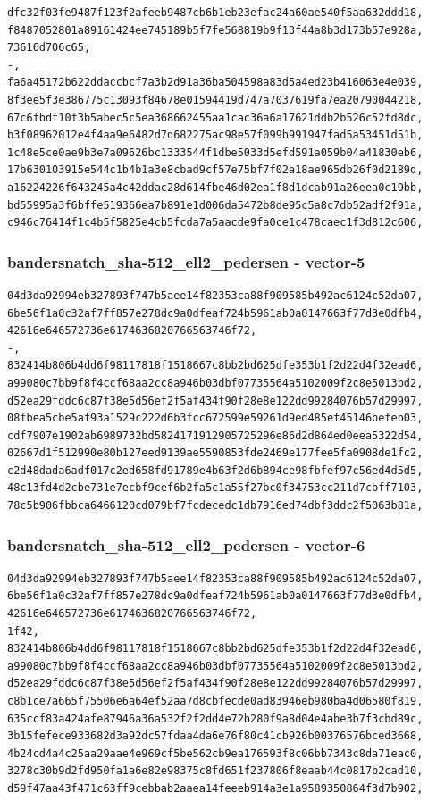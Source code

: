 \documentclass[
]{article}
\begin{document}
\begin{verbatim}
dfc32f03fe9487f123f2afeeb9487cb6b1eb23efac24a60ae540f5aa632ddd18,
f8487052801a89161424ee745189b5f7fe568819b9f13f44a8b3d173b57e928a,
73616d706c65,
-,
fa6a45172b622ddaccbcf7a3b2d91a36ba504598a83d5a4ed23b416063e4e039,
8f3ee5f3e386775c13093f84678e01594419d747a7037619fa7ea20790044218,
67c6fbdf10f3b5abec5c5ea368662455aa1cac36a6a17621ddb2b526c52fd8dc,
b3f08962012e4f4aa9e6482d7d682275ac98e57f099b991947fad5a53451d51b,
1c48e5ce0ae9b3e7a09626bc1333544f1dbe5033d5efd591a059b04a41830eb6,
17b630103915e544c1b4b1a3e8cbad9cf57e75bf7f02a18ae965db26f0d2189d,
a16224226f643245a4c42ddac28d614fbe46d02ea1f8d1dcab91a26eea0c19bb,
bd55995a3f6bffe519366ea7b891e1d006da5472b8de95c5a8c7db52adf2f91a,
c946c76414f1c4b5f5825e4cb5fcda7a5aacde9fa0ce1c478caec1f3d812c606,
\end{verbatim}

\subsubsection{bandersnatch\_sha-512\_ell2\_pedersen -
vector-5}\label{bandersnatch_sha-512_ell2_pedersen---vector-5}

\begin{verbatim}
04d3da92994eb327893f747b5aee14f82353ca88f909585b492ac6124c52da07,
6be56f1a0c32af7ff857e278dc9a0dfeaf724b5961ab0a0147663f77d3e0dfb4,
42616e646572736e6174636820766563746f72,
-,
832414b806b4dd6f98117818f1518667c8bb2bd625dfe353b1f2d22d4f32ead6,
a99080c7bb9f8f4ccf68aa2cc8a946b03dbf07735564a5102009f2c8e5013bd2,
d52ea29fddc6c87f38e5d56ef2f5af434f90f28e8e122dd99284076b57d29997,
08fbea5cbe5af93a1529c222d6b3fcc672599e59261d9ed485ef45146befeb03,
cdf7907e1902ab6989732bd5824171912905725296e86d2d864ed0eea5322d54,
02667d1f512990e80b127eed9139ae5590853fde2469e177fee5fa0908de1fc2,
c2d48dada6adf017c2ed658fd91789e4b63f2d6b894ce98fbfef97c56ed4d5d5,
48c13fd4d2cbe731e7ecbf9cef6b2fa5c1a55f27bc0f34753cc211d7cbff7103,
78c5b906fbbca6466120cd079bf7fcdecedc1db7916ed74dbf3ddc2f5063b81a,
\end{verbatim}

\subsubsection{bandersnatch\_sha-512\_ell2\_pedersen -
vector-6}\label{bandersnatch_sha-512_ell2_pedersen---vector-6}

\begin{verbatim}
04d3da92994eb327893f747b5aee14f82353ca88f909585b492ac6124c52da07,
6be56f1a0c32af7ff857e278dc9a0dfeaf724b5961ab0a0147663f77d3e0dfb4,
42616e646572736e6174636820766563746f72,
1f42,
832414b806b4dd6f98117818f1518667c8bb2bd625dfe353b1f2d22d4f32ead6,
a99080c7bb9f8f4ccf68aa2cc8a946b03dbf07735564a5102009f2c8e5013bd2,
d52ea29fddc6c87f38e5d56ef2f5af434f90f28e8e122dd99284076b57d29997,
c8b1ce7a665f75506e6a64ef52aa7d8cbfecde0ad83946eb980ba4d06580f819,
635ccf83a424afe87946a36a532f2f2dd4e72b280f9a8d04e4abe3b7f3cbd89c,
3b15fefece933682d3a92dc57fdaa4da6e76f80c41cb926b00376576bced3668,
4b24cd4a4c25aa29aae4e969cf5be562cb9ea176593f8c06bb7343c8da71eac0,
3278c30b9d2fd950fa1a6e82e98375c8fd651f237806f8eaab44c0817b2cad10,
d59f47aa43f471c63ff9cebbab2aaea14feeeb914a3e1a9589350864f3d7b902,
\end{verbatim}
\end{document}
